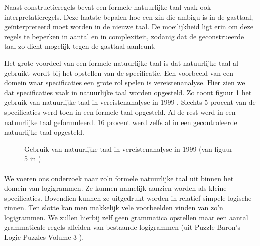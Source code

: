 Naast constructieregels bevat een formele natuurlijke taal vaak ook interpretatieregels. Deze laatste bepalen hoe een zin die ambigu is in de gasttaal, ge\"interpreteerd moet worden in de nieuwe taal. De moeilijkheid ligt erin om deze regels te beperken in aantal en in complexiteit, zodanig dat de geconstrueerde taal zo dicht mogelijk tegen de gasttaal aanleunt.


Het grote voordeel van een formele natuurlijke taal is dat natuurlijke taal al gebruikt wordt bij het opstellen van de specificatie. Een voorbeeld van een domein waar specificaties een grote rol spelen is vereistenanalyse. Hier zien we dat specificaties vaak in natuurlijke taal worden opgesteld. Zo toont figuur \ref{fig:natural-language-use} het gebruik van natuurlijke taal in vereistenanalyse in 1999 \cite{Luisa2004}. Slechts 5 procent van de specificaties werd toen in een formele taal opgesteld. Al de rest werd in een natuurlijke taal geformuleerd. 16 procent werd zelfs al in een gecontroleerde natuurlijke taal opgesteld.

\begin{figure}
  \caption[Gebruik van natuurlijke taal in vereistenanalyse]{Gebruik van natuurlijke taal in vereistenanalyse in 1999 (van figuur 5 in \cite{Luisa2004})}
  \label{fig:natural-language-use}
\end{figure}

\paragraph{} We voeren ons onderzoek naar zo'n formele natuurlijke taal uit binnen het domein van logigrammen. Ze kunnen namelijk aanzien worden als kleine specificaties. Bovendien kunnen ze uitgedrukt worden in relatief simpele logische zinnen. Ten slotte kan men makkelijk vele voorbeelden vinden van zo'n logigrammen. We zullen hierbij zelf geen grammatica opstellen maar een aantal grammaticale regels afleiden van bestaande logigrammen (uit Puzzle Baron's Logic Puzzles Volume 3 \cite{logigrammen}).
